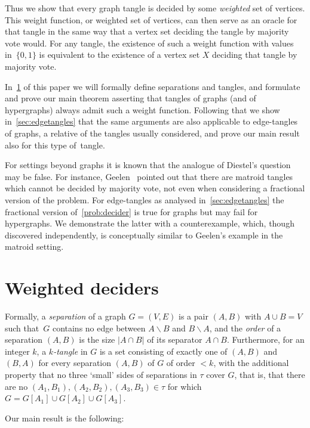 \documentclass[11pt]{article}
\theoremstyle{definition}
\def\sm{\smallsetminus}
\newcommand{\abs}[1]{\left |#1\right |}
\begin{document}
Thus we show that every graph tangle is decided by some {\em weighted} set of vertices. This weight function, or weighted set of vertices, can then serve as an oracle for that tangle in the same way that a vertex set deciding the tangle by majority vote would. For any tangle, the existence of such a weight function with values in~$ \{0,1\} $ is equivalent to the existence of a vertex set $ X $ deciding that tangle by majority vote.

In~\cref{sec:weighted-deciders} of this paper we will formally define separations and tangles, and formulate and prove our main theorem asserting that tangles of graphs (and of hypergraphs) always admit such a weight function. Following that we show in~\cref{sec:edgetangles} that the same arguments are also applicable to edge-tangles of graphs, a relative of the tangles usually considered, and prove our main result also for this type of~tangle.

For settings beyond graphs it is known that the analogue of Diestel's question may be false. For instance, Geelen~\cite{GeelenExample} pointed out that there are matroid tangles which cannot be decided by majority vote, not even when considering a fractional version of the problem. For edge-tangles as analysed in~\cref{sec:edgetangles} the fractional version of~\cref{prob:decider} is true for graphs but may fail for hypergraphs. We demonstrate the latter with a counterexample, which, though discovered independently, is conceptually similar to Geelen's example in the matroid setting.

\section{Weighted deciders}\label{sec:weighted-deciders}

Formally, a {\em separation} of a graph $ G=(V,E) $ is a pair $ (A,B) $ with $ A\cup B=V $ such that~$ G $ contains no edge between $ A\sm B $ and $ B\sm A $, and the {\em order} of a separation $ (A,B) $ is the size $ \abs{A\cap B} $ of its separator $ A\cap B $. Furthermore, for an integer $ k $, a \emph{$ k $-tangle} in $ G $ is a set consisting of exactly one of $ (A,B) $ and $ (B,A) $ for every separation $ (A,B) $ of $ G $ of order $ <k $, with the additional property that no three `small' sides of separations in $ \tau $ cover $ G $, that is, that there are no $ (A_1,B_1),(A_2,B_2),(A_3,B_3)\in\tau $ for which $ G=G[A_1]\cup G[A_2]\cup G[A_3] $.

Our main result is the following:
\end{document}

